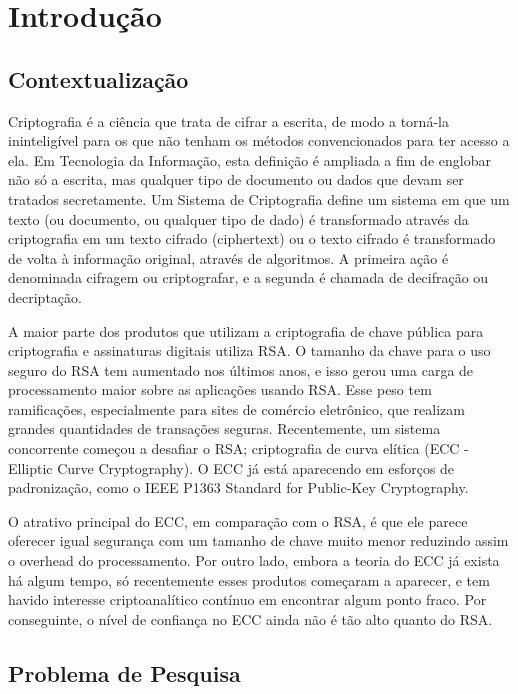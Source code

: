 \chapter[Introdução]{Introdução}

\section*{Contextualização}
Criptografia é a ciência que trata de cifrar a escrita, de modo a torná-la ininteligível para os que não tenham os métodos convencionados para ter acesso a ela. Em Tecnologia da Informação, esta definição é ampliada a fim de englobar não só a escrita, mas qualquer tipo de documento ou dados que devam ser tratados secretamente. Um Sistema de Criptografia define um sistema em que um texto (ou documento, ou qualquer tipo de dado) é transformado através da criptografia em um texto cifrado (ciphertext) ou o texto cifrado é transformado de volta à informação original, através de algoritmos. A primeira ação é denominada cifragem ou criptografar, e a segunda é chamada de decifração ou decriptação. \cite{Portnoi:2005} 

A maior parte dos produtos que utilizam a criptografia de chave pública para criptografia e assinaturas digitais utiliza RSA. O tamanho da chave para o uso seguro do RSA tem aumentado nos últimos anos, e isso gerou uma carga de processamento maior sobre as aplicações usando RSA. Esse peso tem ramificações, especialmente para sites de comércio eletrônico, que realizam grandes quantidades de transações seguras. Recentemente, um sistema concorrente começou a desafiar o RSA; criptografia de curva elítica (ECC - Elliptic Curve Cryptography). O ECC já está aparecendo em esforços de padronização, como o IEEE P1363 Standard for Public-Key Cryptography. \cite{Lee:2011}

O atrativo principal do ECC, em comparação com o RSA, é que ele parece oferecer igual segurança com um tamanho de chave muito menor reduzindo assim o overhead do processamento. Por outro lado, embora a teoria do ECC já exista há algum tempo, só recentemente esses produtos começaram a aparecer, e tem havido interesse criptoanalítico contínuo em encontrar algum ponto fraco. Por conseguinte, o nível de confiança no ECC ainda não é tão alto quanto do RSA. \cite{Stallings:2011}

\section*{Problema de Pesquisa}

